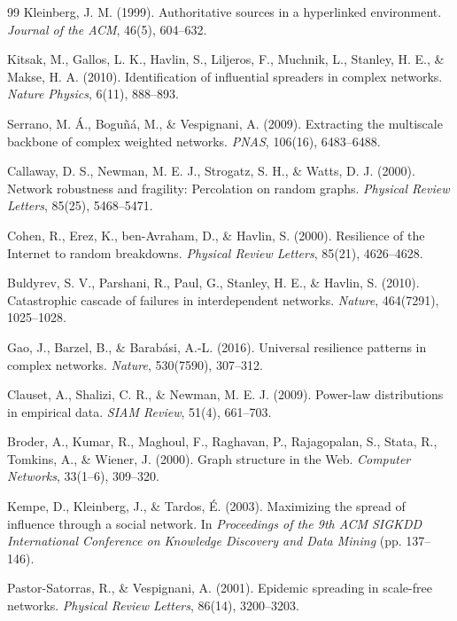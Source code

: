 \begin{thebibliography}{99}
 Kleinberg, J. M. (1999). Authoritative sources in a hyperlinked environment. \emph{Journal of the ACM}, 46(5), 604--632.

 Kitsak, M., Gallos, L. K., Havlin, S., Liljeros, F., Muchnik, L., Stanley, H. E., \& Makse, H. A. (2010). Identification of influential spreaders in complex networks. \emph{Nature Physics}, 6(11), 888--893.

 Serrano, M. Á., Boguñá, M., \& Vespignani, A. (2009). Extracting the multiscale backbone of complex weighted networks. \emph{PNAS}, 106(16), 6483--6488.

 Callaway, D. S., Newman, M. E. J., Strogatz, S. H., \& Watts, D. J. (2000). Network robustness and fragility: Percolation on random graphs. \emph{Physical Review Letters}, 85(25), 5468--5471.

 Cohen, R., Erez, K., ben-Avraham, D., \& Havlin, S. (2000). Resilience of the Internet to random breakdowns. \emph{Physical Review Letters}, 85(21), 4626--4628.

 Buldyrev, S. V., Parshani, R., Paul, G., Stanley, H. E., \& Havlin, S. (2010). Catastrophic cascade of failures in interdependent networks. \emph{Nature}, 464(7291), 1025--1028.

 Gao, J., Barzel, B., \& Barabási, A.-L. (2016). Universal resilience patterns in complex networks. \emph{Nature}, 530(7590), 307--312.

 Clauset, A., Shalizi, C. R., \& Newman, M. E. J. (2009). Power-law distributions in empirical data. \emph{SIAM Review}, 51(4), 661--703.

 Broder, A., Kumar, R., Maghoul, F., Raghavan, P., Rajagopalan, S., Stata, R., Tomkins, A., \& Wiener, J. (2000). Graph structure in the Web. \emph{Computer Networks}, 33(1--6), 309--320.

 Kempe, D., Kleinberg, J., \& Tardos, É. (2003). Maximizing the spread of influence through a social network. In \emph{Proceedings of the 9th ACM SIGKDD International Conference on Knowledge Discovery and Data Mining} (pp. 137--146).

 Pastor-Satorras, R., \& Vespignani, A. (2001). Epidemic spreading in scale-free networks. \emph{Physical Review Letters}, 86(14), 3200--3203.

\end{thebibliography}
